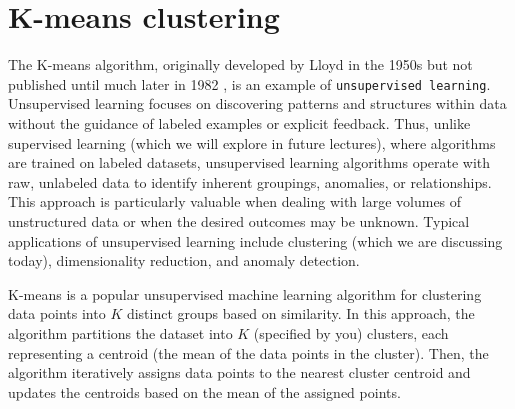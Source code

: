 \documentclass{article}[11pt]
\begin{document}
\section{K-means clustering}
The K-means algorithm, originally developed by Lloyd in the 1950s but not published until much later in 1982 \citep{Lloyd-1982}, is an example of \texttt{unsupervised learning}. 
Unsupervised learning focuses on discovering patterns and structures within data without the guidance of labeled examples or explicit feedback. 
Thus, unlike supervised learning (which we will explore in future lectures), where algorithms are trained on labeled datasets, unsupervised learning algorithms operate with 
raw, unlabeled data to identify inherent groupings, anomalies, or relationships. This approach is particularly valuable when dealing with large volumes of unstructured data or when the desired outcomes may be unknown. 
Typical applications of unsupervised learning include clustering (which we are discussing today), dimensionality reduction, and anomaly detection. 

K-means is a popular unsupervised machine learning algorithm for clustering data points into $K$ distinct groups based on similarity.
In this approach, the algorithm partitions the dataset into $K$ (specified by you) clusters, 
each representing a centroid (the mean of the data points in the cluster). 
Then, the algorithm iteratively assigns data points to the nearest cluster centroid and updates the centroids 
based on the mean of the assigned points.
\end{document}
